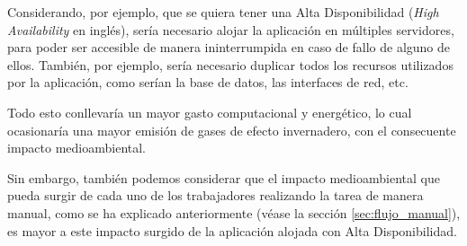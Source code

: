 Considerando, por ejemplo, que se quiera tener una Alta Disponibilidad (\textit{High Availability} en inglés), sería necesario alojar la aplicación en múltiples servidores, para poder ser accesible de manera ininterrumpida en caso de fallo de alguno de ellos. También, por ejemplo, sería necesario duplicar todos los recursos utilizados por la aplicación, como serían la base de datos, las interfaces de red, etc. 

Todo esto conllevaría un mayor gasto computacional y energético, lo cual ocasionaría una mayor emisión de gases de efecto invernadero, con el consecuente impacto medioambiental\cite{impacto_medioambiental}.

Sin embargo, también podemos considerar que el impacto medioambiental que pueda surgir de cada uno de los trabajadores realizando la tarea de manera manual, como se ha explicado anteriormente (véase la sección \ref{sec:flujo_manual}), es mayor a este impacto surgido de la aplicación alojada con Alta Disponibilidad.
